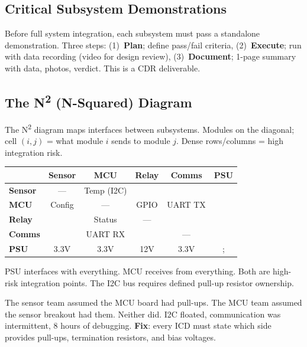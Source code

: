 \documentclass[11pt,letterpaper,twoside,openany]{book}
\begin{document}
\subsection{Critical Subsystem Demonstrations}
Before full system integration, each subsystem must pass a standalone demonstration. Three steps: (1)~\textbf{Plan}; define pass/fail criteria, (2)~\textbf{Execute}; run with data recording (video for design review), (3)~\textbf{Document}; 1-page summary with data, photos, verdict. This is a CDR deliverable.

\subsection{The N\textsuperscript{2} (N-Squared) Diagram}
The N\textsuperscript{2} diagram maps interfaces between subsystems. Modules on the diagonal; cell $(i,j)$ = what module $i$ sends to module $j$. Dense rows/columns = high integration risk.

\begin{greenshieldbox}
\small
\begin{tabularx}{\textwidth}{l|c|c|c|c|c}
 & \textbf{Sensor} & \textbf{MCU} & \textbf{Relay} & \textbf{Comms} & \textbf{PSU} \\
\hline
\textbf{Sensor} & --- & Temp (I2C) & & & \\
\hline
\textbf{MCU} & Config & --- & GPIO & UART TX & \\
\hline
\textbf{Relay} & & Status & --- & & \\
\hline
\textbf{Comms} & & UART RX & & --- & \\
\hline
\textbf{PSU} & 3.3V & 3.3V & 12V & 3.3V &; \\
\end{tabularx}

PSU interfaces with everything. MCU receives from everything. Both are high-risk integration points. The I2C bus requires defined pull-up resistor ownership.
\end{greenshieldbox}

\begin{greenshieldbox}
The sensor team assumed the MCU board had pull-ups. The MCU team assumed the sensor breakout had them. Neither did. I2C floated, communication was intermittent, 8 hours of debugging. \textbf{Fix}: every ICD must state which side provides pull-ups, termination resistors, and bias voltages.
\end{greenshieldbox}
\end{document}
